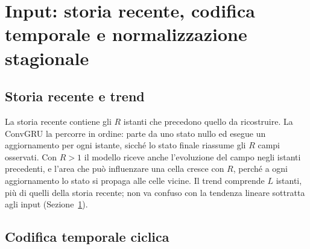 \section{Input: storia recente, codifica temporale e normalizzazione stagionale}
\label{sec:ingresso-normalizzazione-era5}

\subsection{Storia recente e trend}

La storia recente contiene gli $R$ istanti che precedono quello da ricostruire. La ConvGRU la percorre in ordine: parte da uno stato nullo ed esegue un aggiornamento per ogni istante, sicché lo stato finale riassume gli $R$ campi osservati. Con $R>1$ il modello riceve anche l'evoluzione del campo negli istanti precedenti, e l'area che può influenzare una cella cresce con $R$, perché a ogni aggiornamento lo stato si propaga alle celle vicine. Il trend comprende $L$ istanti, più di quelli della storia recente; non va confuso con la tendenza lineare sottratta agli input (Sezione~\ref{sec:ingresso-normalizzazione-era5}).

\subsection{Codifica temporale ciclica}

